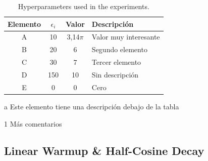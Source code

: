 \begin{appendixs}
	\enabletablerowcolor[2] %
	\begin{table}[H]
		\begin{threeparttable}
		\centering
		\caption{Hyperparameters used in the experiments.}
		\begin{tabular}{cccC{4cm}}
			\hline
			\textbf{Elemento} & $\epsilon_i$ & \textbf{Valor} & \textbf{Descripción} \bigstrut \\
			\hline
			A     & 10    & 3,14$\pi$ & Valor muy interesante \\
			B     & 20    & 6 & Segundo elemento \\
			C     & 30    & 7 & Tercer elemento \\
			D     & 150    & 10 & Sin descripción \\
			E     & 0    & 0 & Cero \\
			\hline
			\end{tabular}
		\begin{tablenotes}
			\item[a] Este elemento tiene una descripción debajo de la tabla
			\item[1] Más comentarios
		\end{tablenotes}
		\end{threeparttable}
		\label{tab:anexo-1}
	\end{table}
	\disabletablerowcolor %

    \subsection{Linear Warmup \& Half-Cosine Decay}





\end{appendixs}
